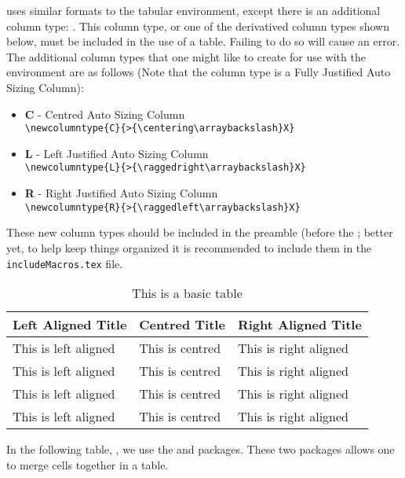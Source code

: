 		 uses similar formats to the tabular environment, except there is an additional column type: .
		This column type, or one of the derivatived column types shown below, must be included in the use of a  table. 
		Failing to do so will cause an error. The additional column types that one might like to create for use with the  environment are as follows (Note that the  column type is a Fully Justified Auto Sizing Column):
		\begin{itemize}
			\item \textbf{C} - Centred Auto Sizing Column\\\lstinline|\newcolumntype{C}{>{\centering\arraybackslash}X}|
			\item \textbf{L} - Left Justified Auto Sizing Column \\\lstinline|\newcolumntype{L}{>{\raggedright\arraybackslash}X}|
			\item \textbf{R} - Right Justified Auto Sizing Column \\\lstinline|\newcolumntype{R}{>{\raggedleft\arraybackslash}X}|
		\end{itemize}
  		These new column types should be included in the preamble (before the \lstinline||; better yet, to help keep things organized it is recommended to include them in the \verb|includeMacros.tex| file.
		\begin{table}[H]
			\caption{This is a basic table}
			\label{tab:basicTable}
			\centering
			\begin{tabularx}{0.75\linewidth}{LCR} 
				\toprule
					\textbf{Left Aligned Title} & \textbf{Centred Title} & \textbf{Right Aligned Title} \\
				\midrule
					This is left aligned & This is centred & This is right aligned\\
					This is left aligned & This is centred & This is right aligned\\
					This is left aligned & This is centred & This is right aligned\\
					This is left aligned & This is centred & This is right aligned\\
				\bottomrule
			\end{tabularx}
		\end{table}
		In the following table, , we use the  and  packages.
		These two packages allows one to merge cells together in a table.

